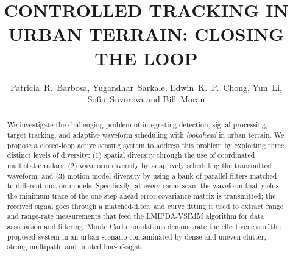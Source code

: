 \documentclass[times]{asjcauth}
\begin{document}


\title{CONTROLLED TRACKING IN URBAN TERRAIN: CLOSING THE LOOP}

\author{Patricia~R.~Barbosa, Yugandhar~Sarkale, Edwin~K.~P.~Chong, Yun~Li, Sofia~Suvorova and Bill~Moran}
\address{Patricia R. Barbosa is with Rockwell Collins, Richardson, TX 75082, USA (e-mail: pbarbosa@ieee.org).\\\hspace*{0.3cm}Yugandhar Sarkale (corresponding author, e-mail: Yugandhar.Sarkale@colostate.edu), and Edwin K. P. Chong (e-mail: Edwin.Chong@colostate.edu) are with the Department of Electrical and Computer Engineering, Colorado State University, Fort Collins, CO 80523-1373, USA.\\\hspace*{0.3cm}Yun Li is with Hillcrest Labs, Rockville, MD 20850, USA.\\\hspace*{0.3cm}Sofia Suvorova (e-mail: sofia.suvorova@unimelb.edu.au), and Bill Moran (e-mail: wmoran@unimelb.edu.au) are with the Department of Electrical and Electronic Engineering, University of Melbourne, Parkville, Vic 3010, Australia.}



\begin{abstract}
We investigate the challenging problem of integrating detection, signal processing, target tracking, and adaptive waveform scheduling with \emph{lookahead} in urban terrain. We propose a closed-loop active sensing system to address this problem by exploiting three distinct levels of diversity: (1) spatial diversity through the use of coordinated multistatic radars; (2) waveform diversity by adaptively scheduling the transmitted waveform; and (3) motion model diversity by using a bank of parallel filters matched to different motion models. Specifically, at every radar scan, the waveform that yields the minimum trace of the one-step-ahead error covariance matrix is transmitted; the received signal goes through a matched-filter, and curve fitting is used to extract range and range-rate measurements that feed the LMIPDA-VSIMM algorithm for data association and filtering. Monte Carlo simulations demonstrate the effectiveness of the proposed system in an urban scenario contaminated by dense and uneven clutter, strong multipath, and limited line-of-sight.
\end{abstract}
\end{document}
